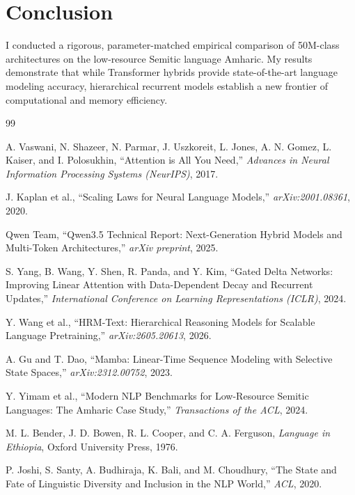 \documentclass[11pt,a4paper]{article}
\begin{document}
\section{Conclusion}
\label{sec:conclusion}

I conducted a rigorous, parameter-matched empirical comparison of 50M-class architectures on the low-resource Semitic language Amharic. My results demonstrate that while Transformer hybrids provide state-of-the-art language modeling accuracy, hierarchical recurrent models establish a new frontier of computational and memory efficiency.

\begin{thebibliography}{99}

A. Vaswani, N. Shazeer, N. Parmar, J. Uszkoreit, L. Jones, A. N. Gomez, L. Kaiser, and I. Polosukhin, ``Attention is All You Need,'' \textit{Advances in Neural Information Processing Systems (NeurIPS)}, 2017.

J. Kaplan et al., ``Scaling Laws for Neural Language Models,'' \textit{arXiv:2001.08361}, 2020.

Qwen Team, ``Qwen3.5 Technical Report: Next-Generation Hybrid Models and Multi-Token Architectures,'' \textit{arXiv preprint}, 2025.

S. Yang, B. Wang, Y. Shen, R. Panda, and Y. Kim, ``Gated Delta Networks: Improving Linear Attention with Data-Dependent Decay and Recurrent Updates,'' \textit{International Conference on Learning Representations (ICLR)}, 2024.

Y. Wang et al., ``HRM-Text: Hierarchical Reasoning Models for Scalable Language Pretraining,'' \textit{arXiv:2605.20613}, 2026.

A. Gu and T. Dao, ``Mamba: Linear-Time Sequence Modeling with Selective State Spaces,'' \textit{arXiv:2312.00752}, 2023.

Y. Yimam et al., ``Modern NLP Benchmarks for Low-Resource Semitic Languages: The Amharic Case Study,'' \textit{Transactions of the ACL}, 2024.

M. L. Bender, J. D. Bowen, R. L. Cooper, and C. A. Ferguson, \textit{Language in Ethiopia}, Oxford University Press, 1976.

P. Joshi, S. Santy, A. Budhiraja, K. Bali, and M. Choudhury, ``The State and Fate of Linguistic Diversity and Inclusion in the NLP World,'' \textit{ACL}, 2020.

\end{thebibliography}
\end{document}

